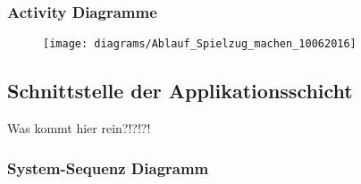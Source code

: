 \subsubsection{Activity Diagramme}
\begin{figure}[h]
  \begin{center}
    \texttt{[image: diagrams/Ablauf\_Spielzug\_machen\_10062016]}
  \end{center}
\end{figure}
\newpage

\subsection{Schnittstelle der Applikationsschicht}

Was kommt hier rein?!?!?!
\newpage

\subsubsection{System-Sequenz Diagramm}

